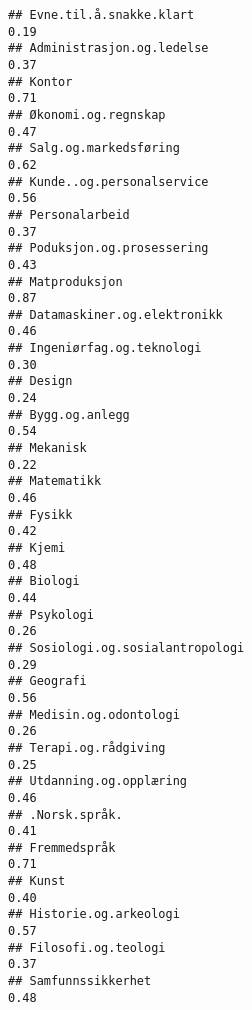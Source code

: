 \documentclass[
]{article}
\begin{document}
\begin{verbatim}
## Evne.til.å.snakke.klart                                                          0.19
## Administrasjon.og.ledelse                                                        0.37
## Kontor                                                                           0.71
## Økonomi.og.regnskap                                                              0.47
## Salg.og.markedsføring                                                            0.62
## Kunde..og.personalservice                                                        0.56
## Personalarbeid                                                                   0.37
## Poduksjon.og.prosessering                                                        0.43
## Matproduksjon                                                                    0.87
## Datamaskiner.og.elektronikk                                                      0.46
## Ingeniørfag.og.teknologi                                                         0.30
## Design                                                                           0.24
## Bygg.og.anlegg                                                                   0.54
## Mekanisk                                                                         0.22
## Matematikk                                                                       0.46
## Fysikk                                                                           0.42
## Kjemi                                                                            0.48
## Biologi                                                                          0.44
## Psykologi                                                                        0.26
## Sosiologi.og.sosialantropologi                                                   0.29
## Geografi                                                                         0.56
## Medisin.og.odontologi                                                            0.26
## Terapi.og.rådgiving                                                              0.25
## Utdanning.og.opplæring                                                           0.46
## .Norsk.språk.                                                                    0.41
## Fremmedspråk                                                                     0.71
## Kunst                                                                            0.40
## Historie.og.arkeologi                                                            0.57
## Filosofi.og.teologi                                                              0.37
## Samfunnssikkerhet                                                                0.48

\end{verbatim}
\end{document}

